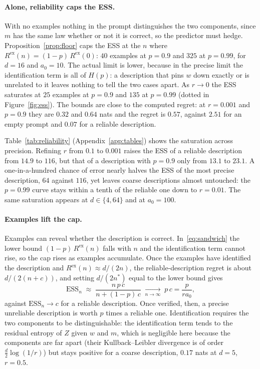 \documentclass[10pt]{article}
\newcommand{\ess}{\mathrm{ESS}}
\begin{document}
\paragraph{Alone, reliability caps the ESS.}
With no examples nothing in the prompt distinguishes the two components, since $m$ has the same law whether or not it is correct, so the predictor must hedge. Proposition~\ref{prop:floor} caps the ESS at the $n$ where $R^{\mathrm{ex}}(n) = (1-p)\,R^{\mathrm{ex}}(0)$: $40$ examples at $p = 0.9$ and $325$ at $p = 0.99$, for $d = 16$ and $a_0 = 10$. The actual limit is lower, because in the precise limit the identification term is all of $H(p)$: a description that pins $w$ down exactly or is unrelated to it leaves nothing to tell the two cases apart. As $r \to 0$ the ESS saturates at $25$ examples at $p = 0.9$ and $135$ at $p = 0.99$ (dotted in Figure~\ref{fig:ess}). The bounds are close to the computed regret: at $r = 0.001$ and $p = 0.9$ they are $0.32$ and $0.64$ nats and the regret is $0.57$, against $2.51$ for an empty prompt and $0.07$ for a reliable description.

Table~\ref{tab:reliability} (Appendix~\ref{app:tables}) shows the saturation across precision. Refining $r$ from $0.1$ to $0.001$ raises the ESS of a reliable description from $14.9$ to $116$, but that of a description with $p = 0.9$ only from $13.1$ to $23.1$. A one-in-a-hundred chance of error nearly halves the ESS of the most precise description, $64$ against $116$, yet leaves coarse descriptions almost untouched: the $p = 0.99$ curve stays within a tenth of the reliable one down to $r = 0.01$. The same saturation appears at $d \in \{4, 64\}$ and at $a_0 = 100$.

\paragraph{Examples lift the cap.}
Examples can reveal whether the description is correct. In~\eqref{eq:sandwich} the lower bound $(1-p)\,R^{\mathrm{ex}}(n)$ falls with $n$ and the identification term cannot rise, so the cap rises as examples accumulate. Once the examples have identified the description and $R^{\mathrm{ex}}(n) \approx d/(2n)$, the reliable-description regret is about $d/(2(n + c))$, and setting $d/(2n^*)$ equal to the lower bound gives
\begin{equation}\label{eq:ess-n}
\ess_n \;\approx\; \frac{n\,p\,c}{n + (1-p)\,c} \;\xrightarrow[n \to \infty]{}\; p\,c = \frac{p}{r a_0},
\end{equation}
against $\ess_n \to c$ for a reliable description. Once verified, then, a precise unreliable description is worth $p$ times a reliable one. Identification requires the two components to be distinguishable: the identification term tends to the residual entropy of $Z$ given $w$ and $m$, which is negligible here because the components are far apart (their Kullback--Leibler divergence is of order $\tfrac{d}{2}\log(1/r)$) but stays positive for a coarse description, $0.17$ nats at $d = 5$, $r = 0.5$.
\end{document}

